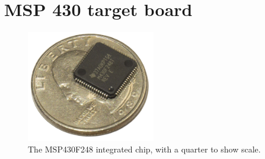 \section{MSP 430 target board}
\label{MSP430Target}

\begin{figure}
\begin{center}
\includegraphics[width=0.5\textwidth]{images/QFPFoot.jpg}
\caption{The MSP430F248 integrated chip, with a quarter to show scale.}
\label{Fig:QFPFoot}
\end{center}
\end{figure}

